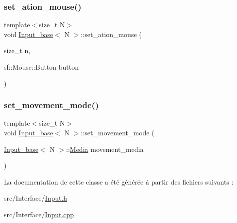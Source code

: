 \mbox{\label{class_input__base_a302f14b88b743a1b6510d632c141971f}} 
\subsubsection{\texorpdfstring{set\+\_\+ation\+\_\+mouse()}{set\_ation\_mouse()}}
{\footnotesize\ttfamily template$<$size\+\_\+t N$>$ \\
void \hyperlink{class_input__base}{Input\+\_\+base}$<$ N $>$\+::set\+\_\+ation\+\_\+mouse (\begin{DoxyParamCaption}\item[{size\+\_\+t}]{n,  }\item[{sf\+::\+Mouse\+::\+Button}]{button }\end{DoxyParamCaption})}

\mbox{\label{class_input__base_a103633f42d3fa58352a12b54ed4b3faf}} 
\subsubsection{\texorpdfstring{set\+\_\+movement\+\_\+mode()}{set\_movement\_mode()}}
{\footnotesize\ttfamily template$<$size\+\_\+t N$>$ \\
void \hyperlink{class_input__base}{Input\+\_\+base}$<$ N $>$\+::set\+\_\+movement\+\_\+mode (\begin{DoxyParamCaption}\item[{\hyperlink{class_input__base}{Input\+\_\+base}$<$ N $>$\+::\hyperlink{class_input__base_a455585e7933485981b3d7bfcad3a47c6}{Media}}]{movement\+\_\+media }\end{DoxyParamCaption})}



La documentation de cette classe a été générée à partir des fichiers suivants \+:\begin{DoxyCompactItemize}
\item 
src/\+Interface/\hyperlink{_input_8h}{Input.\+h}\item 
src/\+Interface/\hyperlink{_input_8cpp}{Input.\+cpp}\end{DoxyCompactItemize}

